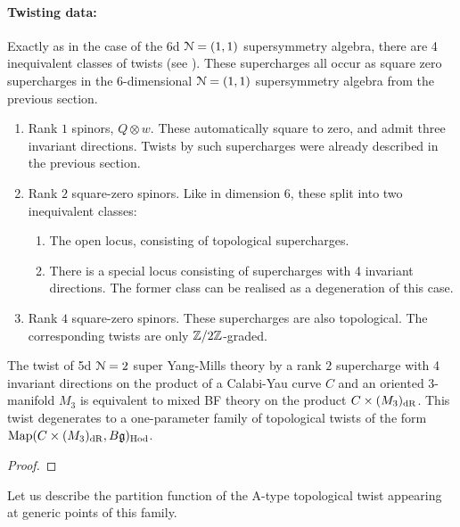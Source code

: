 \documentclass[10pt, oneside]{article}
\begin{document}
\paragraph{Twisting data:}
Exactly as in the case of the 6d $\mathcal{N}=(1,1)$ supersymmetry algebra, there are 4 inequivalent classes of twists (see \cite[Section 4.5]{ElliottSafronov}).  These supercharges all occur as square zero supercharges in the 6-dimensional $\mathcal{N}=(1,1)$ supersymmetry algebra from the previous section.
\begin{enumerate}
 \item Rank $1$ spinors, $Q \otimes w$.  These automatically square to zero, and admit three invariant directions.  Twists by such supercharges were already described in the previous section.
 \item Rank $2$ square-zero spinors.  Like in dimension 6, these split into two inequivalent classes:
 \begin{enumerate}
 \item The open locus, consisting of topological supercharges.
 \item There is a special locus consisting of supercharges with 4 invariant directions.  The former class can be realised as a degeneration of this case.
 \end{enumerate}
 \item Rank $4$ square-zero spinors.  These supercharges are also topological.  The corresponding twists are only $\mathbb Z/2\mathbb Z$-graded.
\end{enumerate}

\begin{theorem} \label{5d_rk2_twist_thm}
The twist of 5d $\mathcal{N}=2$ super Yang-Mills theory by a rank $2$ supercharge with 4 invariant directions on the product of a Calabi-Yau curve $C$ and an oriented 3-manifold $M_3$ is equivalent to mixed BF theory on the product $C \times (M_3)_{\mathrm{dR}}$. This twist degenerates to a one-parameter family of topological twists of the form $\operatorname{Map}(C \times (M_3)_{\mathrm{dR}}, B\mathfrak{g})_{\mathrm{Hod}}$.
\end{theorem}

\begin{proof}
 
\end{proof}

Let us describe the partition function of the A-type topological twist appearing at generic points of this family.  
\begin{theorem}
\end{theorem}
\end{document}
